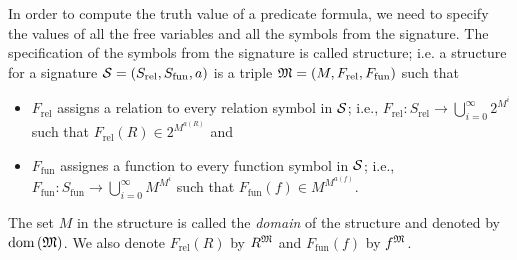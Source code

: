 In order to compute the truth value of a predicate formula, we need to specify
the values of all the free variables and all the symbols from the signature.
The specification of the symbols from the signature is called structure; i.e.
a structure for a signature 
$\mathcal{S} = (S_\mathrm{rel}, S_\mathrm{fun}, a)$
is a triple $\mathfrak{M} = (M, F_\mathrm{rel}, F_\mathrm{fun})$ such that
\begin{itemize}
  \item $F_\mathrm{rel}$ assigns a relation to every relation symbol in
    $\mathcal{S}$; i.e., 
    $F_\mathrm{rel} : S_\mathrm{rel} \to \bigcup_{i = 0}^\infty 2^{M^i}$
    such that $F_\mathrm{rel}(R) \in 2^{M^{a(R)}}$ and
  \item $F_\mathrm{fun}$ assignes a function to every function symbol in
    $\mathcal{S}$; i.e.,
    $F_\mathrm{fun} : S_\mathrm{fun} \to \bigcup_{i = 0}^\infty M^{M^i}$
    such that $F_\mathrm{fun}(f) \in M^{M^{a(f)}}$.
\end{itemize}
The set $M$ in the structure is called the \emph{domain} of the structure and
denoted by $\mathrm{dom}\left({\mathfrak{M}}\right)$. We also denote $F_\mathrm{rel}(R)$ by
$R^{\mathfrak{M}}$ and $F_\mathrm{fun}(f)$ by $f^{\mathfrak{M}}$.


